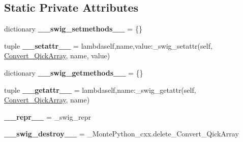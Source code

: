 \subsection*{Static Private Attributes}
\begin{DoxyCompactItemize}
\item 
\hypertarget{classMontePython__cxx_1_1Convert__QickArray_a362f999e51fc5045f9511471e5e1afc8}{}dictionary {\bfseries \+\_\+\+\_\+swig\+\_\+setmethods\+\_\+\+\_\+} = \{\}\label{classMontePython__cxx_1_1Convert__QickArray_a362f999e51fc5045f9511471e5e1afc8}

\item 
\hypertarget{classMontePython__cxx_1_1Convert__QickArray_a76d8184c750a0b62914cd166ff1f1754}{}tuple {\bfseries \+\_\+\+\_\+setattr\+\_\+\+\_\+} = lambdaself,name,value\+:\+\_\+swig\+\_\+setattr(self, \hyperlink{classMontePython__cxx_1_1Convert__QickArray}{Convert\+\_\+\+Qick\+Array}, name, value)\label{classMontePython__cxx_1_1Convert__QickArray_a76d8184c750a0b62914cd166ff1f1754}

\item 
\hypertarget{classMontePython__cxx_1_1Convert__QickArray_a57019f25e7bb80649b4b65e1613a0bc7}{}dictionary {\bfseries \+\_\+\+\_\+swig\+\_\+getmethods\+\_\+\+\_\+} = \{\}\label{classMontePython__cxx_1_1Convert__QickArray_a57019f25e7bb80649b4b65e1613a0bc7}

\item 
\hypertarget{classMontePython__cxx_1_1Convert__QickArray_ad1eab0b9364362ed6c36f1896e080993}{}tuple {\bfseries \+\_\+\+\_\+getattr\+\_\+\+\_\+} = lambdaself,name\+:\+\_\+swig\+\_\+getattr(self, \hyperlink{classMontePython__cxx_1_1Convert__QickArray}{Convert\+\_\+\+Qick\+Array}, name)\label{classMontePython__cxx_1_1Convert__QickArray_ad1eab0b9364362ed6c36f1896e080993}

\item 
\hypertarget{classMontePython__cxx_1_1Convert__QickArray_a10b77a508664a837fff2f88f65fea5b7}{}{\bfseries \+\_\+\+\_\+repr\+\_\+\+\_\+} = \+\_\+swig\+\_\+repr\label{classMontePython__cxx_1_1Convert__QickArray_a10b77a508664a837fff2f88f65fea5b7}

\item 
\hypertarget{classMontePython__cxx_1_1Convert__QickArray_a989ee4b28c717571eb3ddd100de9d9cc}{}{\bfseries \+\_\+\+\_\+swig\+\_\+destroy\+\_\+\+\_\+} = \+\_\+\+Monte\+Python\+\_\+cxx.\+delete\+\_\+\+Convert\+\_\+\+Qick\+Array\label{classMontePython__cxx_1_1Convert__QickArray_a989ee4b28c717571eb3ddd100de9d9cc}

\end{DoxyCompactItemize}


